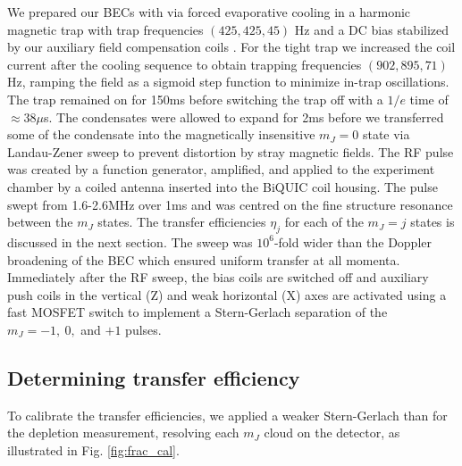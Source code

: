 	We prepared our BECs with via forced evaporative cooling in a harmonic magnetic trap with trap frequencies $(425,425,45)$ Hz and a DC bias stabilized by our auxiliary field compensation coils \cite{Dall07,Dedman07}. For the tight trap we increased the coil current after the cooling sequence to obtain trapping frequencies $(902,895,71)$ Hz, ramping the field as a sigmoid step function to minimize in-trap oscillations. The trap remained on for 150ms before switching the trap off with a $1/e$ time of $\approx38\mu$s. The condensates were allowed to expand for 2ms before we transferred some of the condensate into the magnetically insensitive $m_J=0$ state via Landau-Zener sweep to prevent distortion by stray magnetic fields. The RF pulse was created by a  function generator, amplified, and applied to the experiment chamber by a coiled antenna inserted into the BiQUIC coil housing. The pulse swept from 1.6-2.6MHz over 1ms and was centred on the fine structure resonance between the $m_J$ states. The transfer efficiencies $\eta_j$ for each of the $m_J = j$ states is discussed in the next section. The sweep was $10^6$-fold wider than the Doppler broadening of the BEC which ensured uniform transfer at all momenta. Immediately after the RF sweep, the bias coils are switched off and auxiliary push coils in the vertical (Z) and weak horizontal (X) axes are activated using a fast MOSFET switch to implement a Stern-Gerlach separation of the $m_J = -1,~0,$ and $+1$ pulses.

\subsection{Determining transfer efficiency}

	To calibrate the transfer efficiencies, we applied a weaker Stern-Gerlach than for the depletion measurement, resolving each $m_J$ cloud on the detector, as illustrated in Fig. \ref{fig:frac_cal}. 

